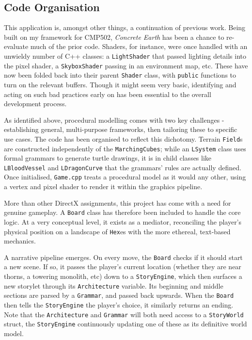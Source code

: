 \documentclass[a4paper, 11pt]{article}
\begin{document}
\begin{flushleft}
\section{Code Organisation}

This application is, amongst other things, a continuation of previous work. Being built on my framework for CMP502, \textit{Concrete Earth} has been a chance to re-evaluate much of the prior code. Shaders, for instance, were once handled with an unwieldy number of C++ classes: a \texttt{LightShader} that passed lighting details into the pixel shader, a \texttt{SkyboxShader} passing in an environment map, etc. These have now been folded back into their parent \texttt{Shader} class, with \texttt{public} functions to turn on the relevant buffers. Though it might seem very basic, identifying and acting on such bad practices early on has been essential to the overall development process.

\vspace{5pt}\noindent
As identified above, procedural modelling comes with two key challenges - establishing general, multi-purpose frameworks, then tailoring these to specific use cases. The code has been organised to reflect this dichotomy. Terrain \texttt{Field}s are constructed independently of the \texttt{MarchingCubes}; while an \texttt{LSystem} class uses formal grammars to generate turtle drawings, it is in child classes like \texttt{LBloodVessel} and \texttt{LDragonCurve} that the grammars' rules are actually defined. Once initialised, \texttt{Game.cpp} treats a procedural model as it would any other, using a vertex and pixel shader to render it within the graphics pipeline.

\vspace{5pt}\noindent
More than other DirectX assignments, this project has come with a need for genuine gameplay. A \texttt{Board} class has therefore been included to handle the core logic. At a very conceptual level, it exists as a mediator, reconciling the player's physical position on a landscape of \texttt{Hex}es with the more ethereal, text-based mechanics. 

\vspace{5pt}\noindent
A narrative pipeline emerges. On every move, the \texttt{Board} checks if it should start a new scene. If so, it passes the player's current location (whether they are near thorns, a towering monolith, etc) down to a \texttt{StoryEngine}, which then surfaces a new storylet through its \texttt{Architecture} variable. Its beginning and middle sections are parsed by a \texttt{Grammar}, and passed back upwards. When the \texttt{Board} then tells the \texttt{StoryEngine} the player's choice, it similarly returns an ending. Note that the \texttt{Architecture} and \texttt{Grammar} will both need access to a \texttt{StoryWorld} struct, the \texttt{StoryEngine} continuously updating one of these as its definitive world model.


\end{flushleft}
\end{document}
